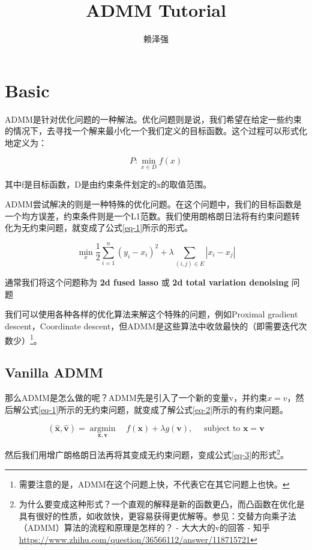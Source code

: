 \documentclass[10pt]{article}
\title{ADMM Tutorial}
\author{赖泽强}
\begin{document}
\maketitle
\tableofcontents

\section{Basic}

ADMM是针对优化问题的一种解法。优化问题则是说，我们希望在给定一些约束的情况下，去寻找一个解来最小化一个我们定义的目标函数。这个过程可以形式化地定义为：

$$
P: \min _{x \in D} f(x)
$$

其中f是目标函数，D是由约束条件划定的x的取值范围。

ADMM尝试解决的则是一种特殊的优化问题。在这个问题中，我们的目标函数是一个均方误差，约束条件则是一个L1范数。我们使用朗格朗日法将有约束问题转化为无约束问题，就变成了公式\ref{eq-1}所示的形式。

\begin{equation}
\min _{x} \frac{1}{2} \sum_{i=1}^{n}\left(y_{i}-x_{i}\right)^{2}+\lambda \sum_{(i, j) \in E}\left|x_{i}-x_{j}\right|
\label{eq-1}
\end{equation}


通常我们将这个问题称为 \textbf{2d fused lasso} 或 \textbf{2d total variation denoising} 问题


我们可以使用各种各样的优化算法来解这个特殊的问题，例如Proximal gradient descent，Coordinate descent，但ADMM是这些算法中收敛最快的（即需要迭代次数少）\footnote{需要注意的是，ADMM在这个问题上快，不代表它在其它问题上也快。}。

\subsection{Vanilla ADMM}

那么ADMM是怎么做的呢？ADMM先是引入了一个新的变量v，并约束$x=v$，然后解公式\ref{eq-1}所示的无约束问题，就变成了解公式\ref{eq-2}所示的有约束问题。

\begin{equation}
(\widehat{\boldsymbol{x}}, \widehat{\boldsymbol{v}})=\underset{\boldsymbol{x}, \boldsymbol{v}}{\operatorname{argmin}} \quad f(\boldsymbol{x})+\lambda g(\boldsymbol{v}), \quad \text { subject to } \boldsymbol{x}=\boldsymbol{v}
\label{eq-2}
\end{equation}

然后我们用增广朗格朗日法再将其变成无约束问题，变成公式\ref{eq-3}的形式\footnote{为什么要变成这种形式？一个直观的解释是新的函数更凸，而凸函数在优化是具有很好的性质，如收敛快，更容易获得更优解等。参见：交替方向乘子法（ADMM）算法的流程和原理是怎样的？ - 大大大的v的回答 - 知乎 \url{https://www.zhihu.com/question/36566112/answer/118715721}}。
\end{document}
